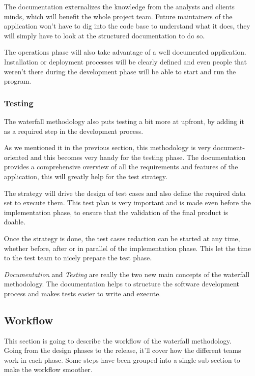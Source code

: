 The documentation externalizes the knowledge from the analysts and clients
minds, which will benefit the whole project team.
Future maintainers of the application won't have to dig into the code base to
understand what it does, they will simply have to look at the structured
documentation to do so.

The operations phase will also take advantage of a well documented
application.
Installation or deployment processes will be clearly defined and even people
that  weren't there during the development phase will be able to start and
run the program.

\subsubsection{Testing}

The waterfall methodology also puts testing a bit more at upfront, by adding
it as a required step in the development process.

As we mentioned it in the previous section, this methodology is very
document-oriented and this becomes very handy for the testing phase.
The documentation provides a comprehensive overview of all the requirements
and features of the application, this will greatly help for the test
strategy.

The strategy will drive the design of test cases and also define the
required data set to execute them.
This test plan is very important and is made even before the implementation
phase, to ensure that the validation of the final product is doable.

Once the strategy is done, the test cases redaction can be started at any
time, whether before, after or in parallel of the implementation phase.
This let the time to the test team to nicely prepare the test phase.

\textit{Documentation} and \textit{Testing} are really the two new main
concepts of the waterfall methodology.
The documentation helps to structure the software development process and
makes tests easier to write and execute.

\subsection{Workflow}\label{subsec:workflow}

This section is going to describe the workflow of the waterfall methodology.
Going from the design phases to the release, it'll cover how the
different teams work in each phase.
Some steps have been grouped into a single sub section to make the
workflow smoother.

